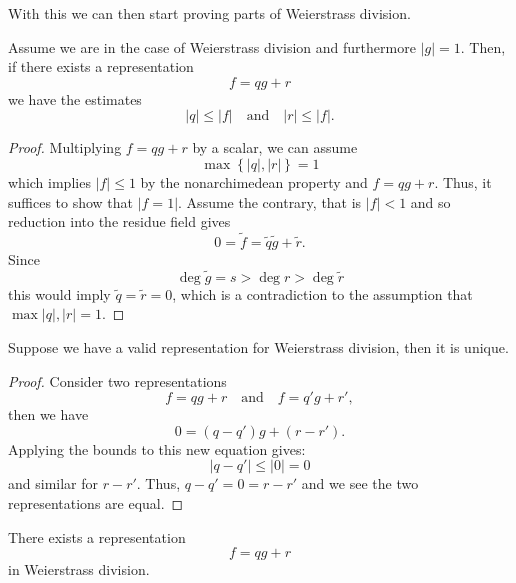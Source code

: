 With this we can then start proving parts of Weierstrass division.

\begin{lemma}\label{WD_bounds}
  Assume we are in the case of Weierstrass division and furthermore $\lvert g \rvert = 1$. Then, if
  there exists a representation
  \[
    f = q g + r
  \]
  we have the estimates
  \[
    \lvert q \rvert \leq \lvert f \rvert \quad \text{and} \quad \lvert r \rvert \leq \lvert f \rvert.
  \]
\end{lemma}

\begin{proof}
  Multiplying $f = q g + r$ by a scalar, we can assume
  \[
    \max \left\{ \lvert q \rvert, \lvert r \rvert \right\} = 1
  \]
  which implies $\lvert f \rvert \leq 1$ by the nonarchimedean property and $f = q g + r$.
  Thus, it suffices to show that $\lvert f = 1 \rvert.$ Assume the contrary, that is $\lvert f \rvert < 1$
  and so reduction into the residue field gives
  \[
    0 = \tilde{f} = \tilde{q} \tilde{g} + \tilde{r}.
  \]
  Since
  \[
    \deg \tilde{g} = s > \deg r > \deg \tilde{r}
  \]
  this would imply $\tilde{q} = \tilde{r} = 0$, which is a contradiction to the assumption that
  $\max {\lvert q \rvert, \lvert r \rvert} = 1$.
\end{proof}

\begin{lemma}\label{WD_uniqueness}
  Suppose we have a valid representation for Weierstrass division, then it is unique.
\end{lemma}

\begin{proof}
  Consider two representations
  \[
    f = q g + r \quad \text{and} \quad f = q' g + r',
  \]
  then we have
  \[
    0 = (q - q') g + (r - r').
  \]
  Applying the bounds to this new equation gives:
  \[
    \lvert q - q' \rvert \leq \lvert 0 \rvert = 0
  \]
  and similar for $r - r'$. Thus, $q - q' = 0 = r - r'$ and we see the two representations are equal.
\end{proof}


\begin{lemma}\label{WD_existence}
  There exists a representation
  \[
    f = q g + r
  \]
  in Weierstrass division.
\end{lemma}



